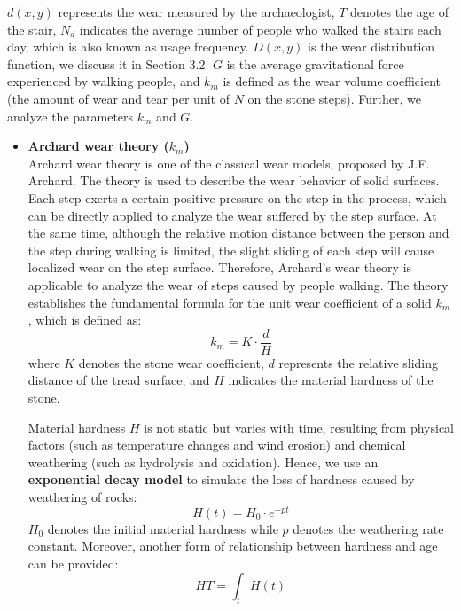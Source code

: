 \documentclass[12pt]{article}  %
\numberwithin{equation}{section} %
\begin{document}
$d(x,y)$ represents the wear measured by the archaeologist, $T$ denotes the age of the stair, $N_d$ indicates the average number of people who walked the stairs each day, which is also known as usage frequency. $D(x,y)$ is the wear distribution function, we discuss it in Section 3.2. $G$ is the average gravitational force  experienced by walking people, and $k_m$ is defined as the wear volume coefficient (the amount of wear and tear per unit of $N$ on the stone steps). Further, we analyze the parameters $k_m$ and $G$.
\begin{itemize}
	\setlength{\parsep}{0ex} %
	\setlength{\topsep}{2ex} %
	\setlength{\itemsep}{1ex} %
	\item \textbf{Archard wear theory ($k_m$)} \\
\quad Archard wear theory is one of the classical wear models, proposed by J.F. Archard. The theory is used to describe the wear behavior of solid surfaces. Each step exerts a certain positive pressure on the step in the process, which can be directly applied to analyze the wear suffered by the step surface. At the same time, although the relative motion distance between the person and the step during walking is limited, the slight sliding of each step will cause localized wear on the step surface. Therefore, Archard's wear theory is applicable to analyze the wear of steps caused by people walking. The theory establishes the fundamental formula for the unit wear coefficient of a solid $k_m$, which is defined as:
\begin{equation}
    k_m = K\cdot{\frac{d}{H}}
\end{equation}
where $K$ denotes the stone wear coefficient, $d$ represents the relative sliding distance of the tread surface, and $H$ indicates the material hardness of the stone. 

\quad Material hardness $H$ is not static but varies with time, resulting from physical factors (such as temperature changes and wind erosion) and chemical weathering (such as hydrolysis and oxidation). Hence, we use an \textbf{exponential decay model }to simulate the loss of hardness caused by weathering of rocks:
\begin{equation}
    H(t)=H_0⋅e^{{-}{pt}}
\end{equation}
$H_0$ denotes the initial material hardness while $p$ denotes the weathering rate constant. Moreover, another form of relationship between hardness and age can be provided:
\begin{equation}
    {H}{T}=\int_{t}H(t)
    \label{eq:HT} 
\end{equation}


\end{itemize}
\end{document}
